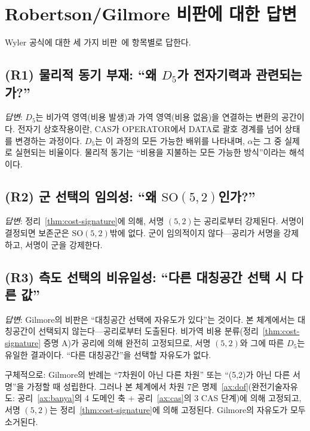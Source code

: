 \documentclass[entropy,article,submit,pdftex,oneauthor]{Definitions/mdpi}
\begin{document}
\section{Robertson/Gilmore 비판에 대한 답변}
\label{sec:robertson}

Wyler 공식에 대한 세 가지 비판~\cite{robertson1971,gilmore1972}에 항목별로 답한다.

\subsection{(R1) 물리적 동기 부재: ``왜 $D_5$가 전자기력과 관련되는가?''~\cite{robertson1971}}

\emph{답변}: $D_5$는 비가역 영역(비용 발생)과 가역 영역(비용 없음)을 연결하는 변환의 공간이다. 전자기 상호작용이란, CAS가 OPERATOR에서 DATA로 괄호 경계를 넘어 상태를 변경하는 과정이다. $D_5$는 이 과정의 모든 가능한 배위를 나타내며, $\alpha$는 그 중 실제로 실현되는 비율이다. 물리적 동기는 ``비용을 지불하는 모든 가능한 방식''이라는 해석이다.

\subsection{(R2) 군 선택의 임의성: ``왜 $\mathrm{SO}(5,2)$인가?''~\cite{robertson1971}}

\emph{답변}: 정리~\ref{thm:cost-signature}에 의해, 서명 $(5,2)$는 공리로부터 강제된다. 서명이 결정되면 보존군은 $\mathrm{SO}(5,2)$밖에 없다. 군이 임의적이지 않다---공리가 서명을 강제하고, 서명이 군을 강제한다.

\subsection{(R3) 측도 선택의 비유일성: ``다른 대칭공간 선택 시 다른 값''~\cite{gilmore1972}}

\emph{답변}: Gilmore의 비판은 ``대칭공간 선택에 자유도가 있다''는 것이다. 본 체계에서는 대칭공간이 선택되지 않는다---공리로부터 도출된다. 비가역 비용 분류(정리~\ref{thm:cost-signature} 증명 A)가 공리에 의해 완전히 고정되므로, 서명 $(5,2)$와 그에 따른 $D_5$는 유일한 결과이다. ``다른 대칭공간''을 선택할 자유도가 없다.

구체적으로: Gilmore의 반례는 ``7차원이 아닌 다른 차원'' 또는 ``(5,2)가 아닌 다른 서명''을 가정할 때 성립한다. 그러나 본 체계에서 차원 7은 명제~\ref{ax:dof}(완전기술자유도: 공리~\ref{ax:banya}의 4 도메인 축 + 공리~\ref{ax:cas}의 3 CAS 단계)에 의해 고정되고, 서명 $(5,2)$는 정리~\ref{thm:cost-signature}에 의해 고정된다. Gilmore의 자유도가 모두 소거된다.
\end{document}
